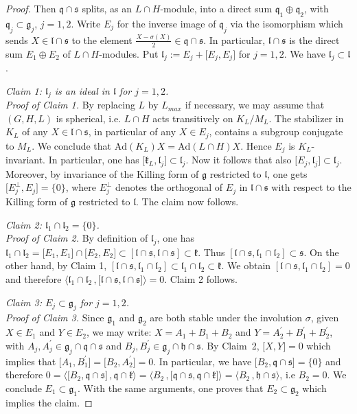 \documentclass[10]{amsart}
\theoremstyle{remark}
\theoremstyle{definition}
\numberwithin{equation}{section}
\newcommand{\Ad}{\text{Ad}}
\newcommand{\fg}{{\mathfrak g}}
\newcommand{\fh}{{\mathfrak h}}
\newcommand{\fk}{{\mathfrak k}}
\newcommand{\fl}{{\mathfrak l}}
\newcommand{\fq}{{\mathfrak q}}
\newcommand{\fs}{{\mathfrak s}}
\newcommand{\IP}[2]{\langle#1\,, #2\rangle}     %
\newcommand{\defn}{{:=}}
\begin{document}
{\begin{proof}
Then $\fq\cap\fs$ splits, as an $L\cap H$-module, into a direct 
sum $\fq_1\oplus\fq_2$, with $\fq_j\subset\fg_j$, $j=1,2$. Write $E_j$ for the inverse image of $\fq_j$ via the isomorphism which sends $X\in\fl\cap\fs$ to the element $\frac{X-\sigma(X)}{2}\in\fq\cap\fs$. 
In particular, $\fl\cap\fs$ is the direct sum $E_1\oplus E_2$ of $L\cap H$-modules. Put ${\fl}_j\defn E_j+\lbrack E_j,E_j\rbrack$ for $j=1,2$. We have $\fl_j\subset \fl$.

{\it Claim 1: ${\fl}_j$ is an ideal in $\fl$ for $j=1,2$.}\\
{\it Proof of Claim 1.} By replacing $L$ by $L_{max}$ if necessary, we may assume that $(G,H,L)$ is spherical, i.e. $L\cap H$ acts transitively on $K_L/M_L$.
The stabilizer in $K_L$ of any $X\in \fl\cap\fs$, in particular of any $X\in E_j$, contains a subgroup conjugate to $M_L$. We conclude that $\Ad(K_L)X=\Ad(L\cap H)X$.
Hence $E_j$ is $K_L$-invariant. 
In particular, one has $\lbrack \fk_L,{\fl}_j\rbrack\subset{\fl}_j$. Now it follows that also
$\lbrack E_j,{\fl}_j\rbrack\subset{\fl}_j$. Moreover, by invariance of the Killing form of $\fg$ restricted to $\fl$, 
one gets $\lbrack E_j^\perp,E_j\rbrack=\{0\}$, where $E_j^\perp$ denotes the orthogonal of $E_j$ in $\fl\cap\fs$ with respect to the Killing form of $\fg$ restricted to $\fl$. The claim now follows. 

{\it Claim 2:  ${\fl}_1\cap{\fl}_2=\{0\}$.}\\
{\it Proof of Claim 2.} By definition of ${\fl}_j$, one has 
${\fl}_1\cap{\fl}_2=\lbrack E_1,E_1\rbrack\cap\lbrack E_2,E_2\rbrack\subset [\fl\cap\fs,\fl\cap\fs]\subset\fk$. Thus $[\fl\cap\fs,\fl_1\cap\fl_2]\subset\fs$.
On the other hand, by Claim 1, $[\fl\cap\fs,\fl_1\cap\fl_2]\subset \fl_1\cap\fl_2\subset\fk$. We obtain $[\fl\cap\fs,\fl_1\cap\fl_2]=0$ and therefore
$\IP{{\fl}_1\cap{\fl}_2}{\lbrack\fl\cap\fs,\fl\cap\fs\rbrack}=0$. Claim 2 follows.

{\it Claim 3:  $E_j\subset\fg_j$ for $j=1,2$.}\\
{\it Proof of Claim 3.} Since $\fg_1$ and $\fg_2$ are both stable under the involution $\sigma$, given $X\in E_1$ and $Y\in E_2$, we may write: $X=A_1+B_1+B_2$ 
and $Y=A_2^\prime+B_1^\prime+B_2^\prime$, with $A_j,A_j^\prime\in\fg_j\cap\fq\cap\fs$ and $B_j, B_j^\prime\in\fg_j\cap\fh\cap\fs$. 
By Claim~2, $\lbrack X,Y\rbrack=0$ which implies that $\lbrack A_1,B_1^\prime\rbrack=\lbrack B_2,A_2^\prime\rbrack=0$. In particular, we have 
$\lbrack B_2,\fq\cap\fs\rbrack=\{0\}$ and therefore $0=\IP{\lbrack B_2,\fq\cap\fs\rbrack}{\fq\cap\fk}=\IP{B_2}{\lbrack\fq\cap\fs,\fq\cap\fk\rbrack}=\IP{B_2}{\fh\cap\fs}$, i.e $B_2=0$. We conclude $E_1\subset\fg_1$. With the same arguments, one proves that $E_2\subset\fg_2$ which implies the claim.


\end{proof}}
\end{document}
